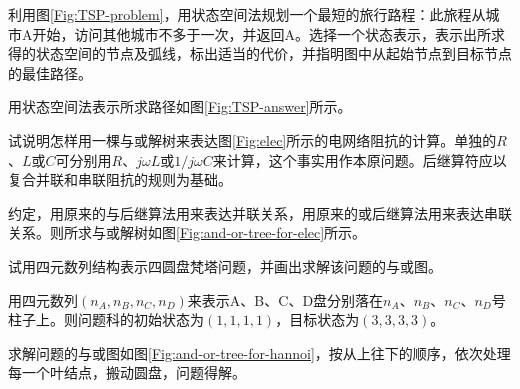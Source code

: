 \begin{question}
利用图\ref{Fig:TSP-problem}，用状态空间法规划一个最短的旅行路程：此旅程从城市A开始，访问其他城市不多于一次，并返回A。选择一个状态表示，表示出所求得的状态空间的节点及弧线，标出适当的代价，并指明图中从起始节点到目标节点的最佳路径。
\end{question}
\begin{solution}
用状态空间法表示所求路径如图\ref{Fig:TSP-answer}所示。
	\begin{figure} [h]
		\centering
	\end{figure}
\end{solution}

\begin{question}
试说明怎样用一棵与或解树来表达图\ref{Fig:elec}所示的电网络阻抗的计算。单独的$R$、$L$或$C$可分别用$R$、$j\omega L$或$1/j\omega C$来计算，这个事实用作本原问题。后继算符应以复合并联和串联阻抗的规则为基础。
\end{question}
\begin{solution}
约定，用原来的与后继算法用来表达并联关系，用原来的或后继算法用来表达串联关系。则所求与或解树如图\ref{Fig:and-or-tree-for-elec}所示。
\end{solution}

\begin{question}
试用四元数列结构表示四圆盘梵塔问题，并画出求解该问题的与或图。
\end{question}
\begin{solution}
用四元数列$(n_A, n_B, n_C, n_D)$来表示A、B、C、D盘分别落在$n_A$、$n_B$、$n_C$、$n_D$号柱子上。则问题科的初始状态为$(1,1,1,1)$，目标状态为$(3,3,3,3)$。\par
求解问题的与或图如图\ref{Fig:and-or-tree-for-hannoi}，按从上往下的顺序，依次处理每一个叶结点，搬动圆盘，问题得解。 
\end{solution}

